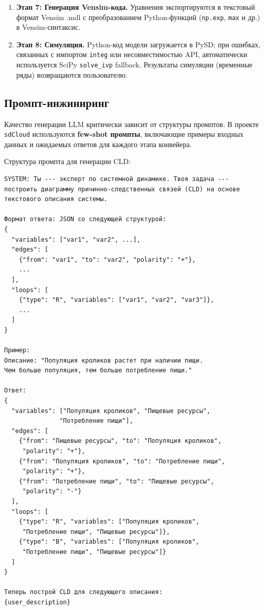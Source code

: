 \begin{enumerate}
    \item \textbf{Этап 7: Генерация Vensim-кода.} Уравнения экспортируются в текстовый формат Vensim .mdl с преобразованием Python-функций (\texttt{np.exp}, \texttt{max} и др.) в Vensim-синтаксис.

    \item \textbf{Этап 8: Симуляция.} Python-код модели загружается в PySD; при ошибках, связанных с импортом \texttt{integ} или несовместимостью API, автоматически используется SciPy \texttt{solve\_ivp} fallback. Результаты симуляции (временные ряды) возвращаются пользователю.
\end{enumerate}

\subsection{Промпт-инжиниринг}

Качество генерации LLM критически зависит от структуры промптов. В проекте \texttt{sdCloud} используются \textbf{few-shot промпты}, включающие примеры входных данных и ожидаемых ответов для каждого этапа конвейера.

Структура промпта для генерации CLD:

\begin{lstlisting}[caption={Структура промпта для генерации CLD}]
SYSTEM: Ты --- эксперт по системной динамике. Твоя задача ---
построить диаграмму причинно-следственных связей (CLD) на основе
текстового описания системы.

Формат ответа: JSON со следующей структурой:
{
  "variables": ["var1", "var2", ...],
  "edges": [
    {"from": "var1", "to": "var2", "polarity": "+"},
    ...
  ],
  "loops": [
    {"type": "R", "variables": ["var1", "var2", "var3"]},
    ...
  ]
}

Пример:
Описание: "Популяция кроликов растет при наличии пищи.
Чем больше популяция, тем больше потребление пищи."

Ответ:
{
  "variables": ["Популяция кроликов", "Пищевые ресурсы",
               "Потребление пищи"],
  "edges": [
    {"from": "Пищевые ресурсы", "to": "Популяция кроликов",
     "polarity": "+"},
    {"from": "Популяция кроликов", "to": "Потребление пищи",
     "polarity": "+"},
    {"from": "Потребление пищи", "to": "Пищевые ресурсы",
     "polarity": "-"}
  ],
  "loops": [
    {"type": "R", "variables": ["Популяция кроликов",
     "Потребление пищи", "Пищевые ресурсы"]},
    {"type": "B", "variables": ["Популяция кроликов",
     "Потребление пищи", "Пищевые ресурсы"]}
  ]
}

Теперь построй CLD для следующего описания:
{user_description}
\end{lstlisting}

